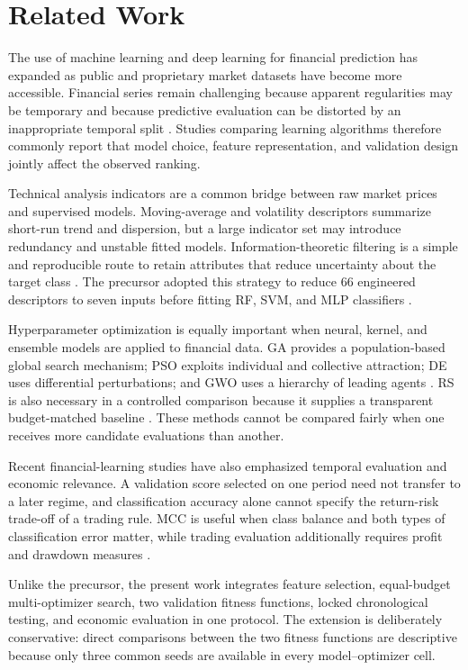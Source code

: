 \section{Related Work}\label{sec:relatedwork}

The use of machine learning and deep learning for financial prediction has expanded as public and proprietary market datasets have become more accessible. Financial series remain challenging because apparent regularities may be temporary and because predictive evaluation can be distorted by an inappropriate temporal split \cite{henrique2019stock_review,rajwar2023exhaustive_review}. Studies comparing learning algorithms therefore commonly report that model choice, feature representation, and validation design jointly affect the observed ranking.

Technical analysis indicators are a common bridge between raw market prices and supervised models. Moving-average and volatility descriptors summarize short-run trend and dispersion, but a large indicator set may introduce redundancy and unstable fitted models. Information-theoretic filtering is a simple and reproducible route to retain attributes that reduce uncertainty about the target class \cite{lei2012feature}. The precursor adopted this strategy to reduce 66 engineered descriptors to seven inputs before fitting RF, SVM, and MLP classifiers \cite{souza2026ijcnn}.

Hyperparameter optimization is equally important when neural, kernel, and ensemble models are applied to financial data. GA provides a population-based global search mechanism; PSO exploits individual and collective attraction; DE uses differential perturbations; and GWO uses a hierarchy of leading agents \cite{goldberg1989ga,kennedy1995pso,storn1997de,faris2018gwo_review}. RS is also necessary in a controlled comparison because it supplies a transparent budget-matched baseline \cite{bergstra2012random_search}. These methods cannot be compared fairly when one receives more candidate evaluations than another.

Recent financial-learning studies have also emphasized temporal evaluation and economic relevance. A validation score selected on one period need not transfer to a later regime, and classification accuracy alone cannot specify the return-risk trade-off of a trading rule. MCC is useful when class balance and both types of classification error matter, while trading evaluation additionally requires profit and drawdown measures \cite{chicco2020mcc,makridakis2018statistical}.

Unlike the precursor, the present work integrates feature selection, equal-budget multi-optimizer search, two validation fitness functions, locked chronological testing, and economic evaluation in one protocol. The extension is deliberately conservative: direct comparisons between the two fitness functions are descriptive because only three common seeds are available in every model--optimizer cell.
